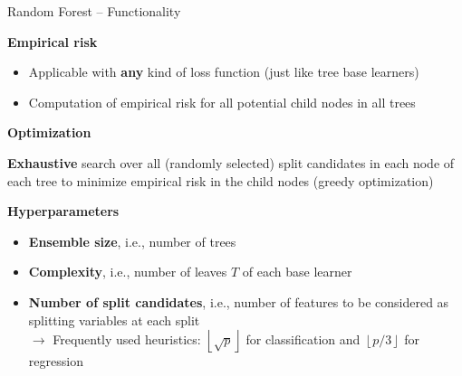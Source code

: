\documentclass[11pt,compress,t,notes=noshow, xcolor=table]{beamer}
\newcommand{\highlight}[1]{\textcolor{highlightcol}{\textbf{#1}}}
\begin{document}
\begin{frame}{Random Forest -- Functionality}

\footnotesize

\highlight{Empirical risk}

\begin{itemize}
  \item Applicable with \textbf{any} kind of loss function (just like tree base 
  learners)
  \item Computation of empirical risk for all potential child nodes in all trees
\end{itemize}

\medskip

\highlight{Optimization}

\textbf{Exhaustive} search over
all (randomly selected) split candidates in each node of each tree to minimize
empirical risk in the child nodes (greedy optimization) \\

\medskip

\highlight{Hyperparameters}

\begin{itemize}
  \item \textbf{Ensemble size}, i.e., number of trees
  \item \textbf{Complexity}, i.e., number of leaves $T$ of each base learner
  \item \textbf{Number of split candidates}, i.e., number of features to be
  considered as splitting variables at each split \\
  $\rightarrow$ Frequently used heuristics: 
  $\left \lfloor{\sqrt{p}}\right \rfloor$ for classification and
  $\left \lfloor{p/3}\right \rfloor$ for regression
\end{itemize}

\medskip

  
\end{frame}


\end{document}
